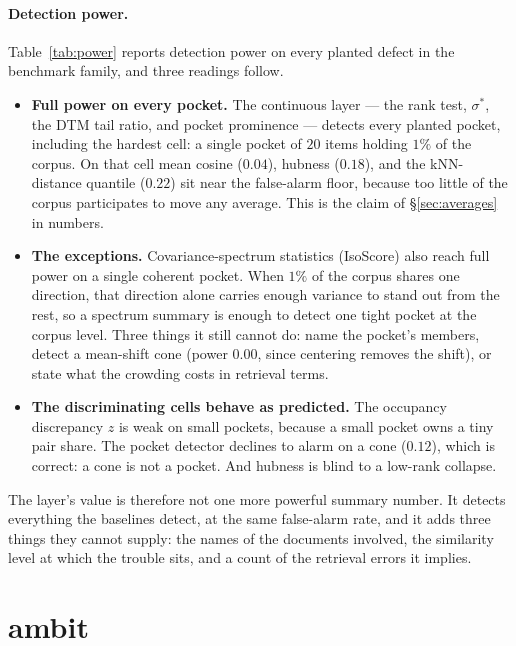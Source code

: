 \documentclass[11pt,letterpaper]{article}
\newcommand{\sstar}{\sigma^{*}}
\begin{document}
\paragraph{Detection power.}
Table~\ref{tab:power} reports detection power on every planted defect in
the benchmark family, and three readings follow.
\begin{itemize}
\item \textbf{Full power on every pocket.} The continuous layer --- the
  rank test, $\sstar$, the DTM tail ratio, and pocket prominence ---
  detects every planted pocket, including the hardest cell: a single
  pocket of $20$ items holding $1\%$ of the corpus. On that cell mean
  cosine ($0.04$), hubness ($0.18$), and the kNN-distance quantile
  ($0.22$) sit near the false-alarm floor, because too little of the
  corpus participates to move any average. This is the claim of
  \S\ref{sec:averages} in numbers.
\item \textbf{The exceptions.} Covariance-spectrum statistics (IsoScore)
  also reach full power on a single coherent pocket. When $1\%$ of the
  corpus shares one direction, that direction alone carries enough
  variance to stand out from the rest, so a spectrum summary is enough to
  detect one tight pocket at the corpus level. Three things it still
  cannot do: name the pocket's members, detect a mean-shift cone (power
  $0.00$, since centering removes the shift), or state what the crowding
  costs in retrieval terms.
\item \textbf{The discriminating cells behave as predicted.} The
  occupancy discrepancy $z$ is weak on small pockets, because a small
  pocket owns a tiny pair share. The pocket detector declines to alarm on
  a cone ($0.12$), which is correct: a cone is not a pocket. And hubness
  is blind to a low-rank collapse.
\end{itemize}
The layer's value is therefore not one more powerful summary number.
It detects everything the baselines detect, at the same false-alarm
rate, and it adds three things they cannot supply: the names of the
documents involved, the similarity level at which the trouble sits, and
a count of the retrieval errors it implies.

\section{\textsf{ambit}}
\label{sec:instrument}
\end{document}
